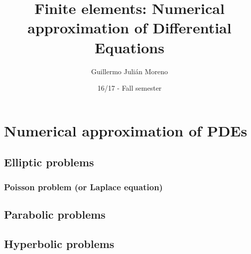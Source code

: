 \documentclass[palatino,twoside]{epflnotes}
\title{Finite elements: Numerical approximation of Differential Equations}
\author{Guillermo Julián Moreno}
\date{16/17 - Fall semester}
\newif\ifincludefirstsemester
\begin{document}
\frontmatter
\pagestyle{plain}
\maketitle

\tableofcontents
\mainmatter

\ifincludefirstsemester
\part{Prelude: Fundamentals on analysis}


\part{Theory of finite elements}


\part{Numerical approximation of ODEs}

\fi

\part{Numerical approximation of PDEs}

\chapter{Elliptic problems}

\section{Poisson problem (or Laplace equation)}
\ifincludefirstsemester\fi


\ifincludefirstsemester\fi


\chapter{Parabolic problems}


\chapter{Hyperbolic problems}

\end{document}
